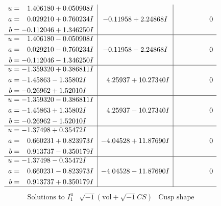 \documentclass[1p]{elsarticle_modified}
\theoremstyle{definition}
\newcommand{\I}{\sqrt{-1}}
\begin{document}
$$\begin{array}{c|c|c}
\begin{aligned}
u &= \phantom{-}1.406180 + 0.050908 I \\
a &= \phantom{-}0.029210 + 0.760234 I \\
b &= -0.112046 + 1.346250 I\end{aligned}
 & -0.11958 + 2.24868 I & \phantom{-0.000000 } 0 \\ \hline\begin{aligned}
u &= \phantom{-}1.406180 - 0.050908 I \\
a &= \phantom{-}0.029210 - 0.760234 I \\
b &= -0.112046 - 1.346250 I\end{aligned}
 & -0.11958 - 2.24868 I & \phantom{-0.000000 } 0 \\ \hline\begin{aligned}
u &= -1.359320 + 0.386811 I \\
a &= -1.45863 - 1.35802 I \\
b &= -0.26962 + 1.52010 I\end{aligned}
 & \phantom{-}4.25937 + 10.27340 I & \phantom{-0.000000 } 0 \\ \hline\begin{aligned}
u &= -1.359320 - 0.386811 I \\
a &= -1.45863 + 1.35802 I \\
b &= -0.26962 - 1.52010 I\end{aligned}
 & \phantom{-}4.25937 - 10.27340 I & \phantom{-0.000000 } 0 \\ \hline\begin{aligned}
u &= -1.37498 + 0.35472 I \\
a &= \phantom{-}0.660231 + 0.823973 I \\
b &= \phantom{-}0.913737 - 0.350179 I\end{aligned}
 & -4.04528 + 11.87690 I & \phantom{-0.000000 } 0 \\ \hline\begin{aligned}
u &= -1.37498 - 0.35472 I \\
a &= \phantom{-}0.660231 - 0.823973 I \\
b &= \phantom{-}0.913737 + 0.350179 I\end{aligned}
 & -4.04528 - 11.87690 I & \phantom{-0.000000 } 0\\
 \hline 
 \end{array}$$\newpage$$\begin{array}{c|c|c}  
\text{Solutions to }I^u_{1}& \I (\text{vol} + \sqrt{-1}CS) & \text{Cusp shape}\\
 \hline 
\begin{aligned}

\end{aligned}
\end{array}$$
\end{document}
